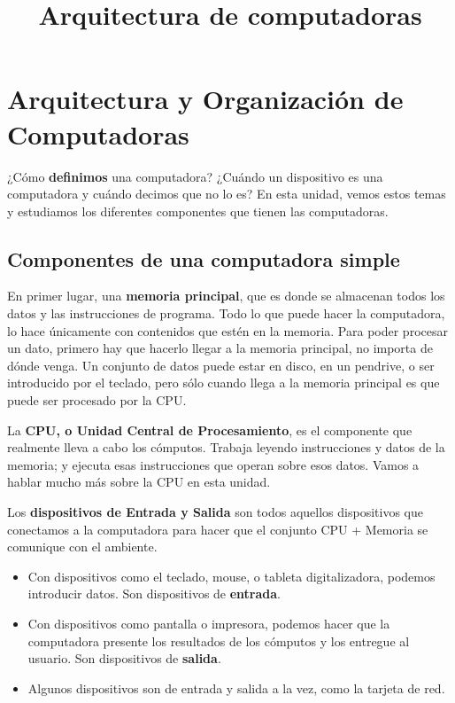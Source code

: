 \documentclass[spanish,a4paper,]{article}
\title{Arquitectura de computadoras}
\date{}
\providecommand{\tightlist}{%
  \setlength{\itemsep}{0pt}\setlength{\parskip}{0pt}}
\begin{document}
\maketitle

\hypertarget{arquitectura-y-organizaciuxf3n-de-computadoras}{%
\section{Arquitectura y Organización de
Computadoras}\label{arquitectura-y-organizaciuxf3n-de-computadoras}}

¿Cómo \textbf{definimos} una computadora? ¿Cuándo un dispositivo es una
computadora y cuándo decimos que no lo es? En esta unidad, vemos estos
temas y estudiamos los diferentes componentes que tienen las
computadoras.

\hypertarget{componentes-de-una-computadora-simple}{%
\subsection{Componentes de una computadora
simple}\label{componentes-de-una-computadora-simple}}

En primer lugar, una \textbf{memoria principal}, que es donde se
almacenan todos los datos y las instrucciones de programa. Todo lo que
puede hacer la computadora, lo hace únicamente con contenidos que estén
en la memoria. Para poder procesar un dato, primero hay que hacerlo
llegar a la memoria principal, no importa de dónde venga. Un conjunto de
datos puede estar en disco, en un pendrive, o ser introducido por el
teclado, pero sólo cuando llega a la memoria principal es que puede ser
procesado por la CPU.

La \textbf{CPU, o Unidad Central de Procesamiento}, es el componente que
realmente lleva a cabo los cómputos. Trabaja leyendo instrucciones y
datos de la memoria; y ejecuta esas instrucciones que operan sobre esos
datos. Vamos a hablar mucho más sobre la CPU en esta unidad.

Los \textbf{dispositivos de Entrada y Salida} son todos aquellos
dispositivos que conectamos a la computadora para hacer que el conjunto
CPU + Memoria se comunique con el ambiente.

\begin{itemize}
\tightlist
\item
  Con dispositivos como el teclado, mouse, o tableta digitalizadora,
  podemos introducir datos. Son dispositivos de \textbf{entrada}.
\item
  Con dispositivos como pantalla o impresora, podemos hacer que la
  computadora presente los resultados de los cómputos y los entregue al
  usuario. Son dispositivos de \textbf{salida}.
\item
  Algunos dispositivos son de entrada y salida a la vez, como la tarjeta
  de red.
\end{itemize}
\end{document}
